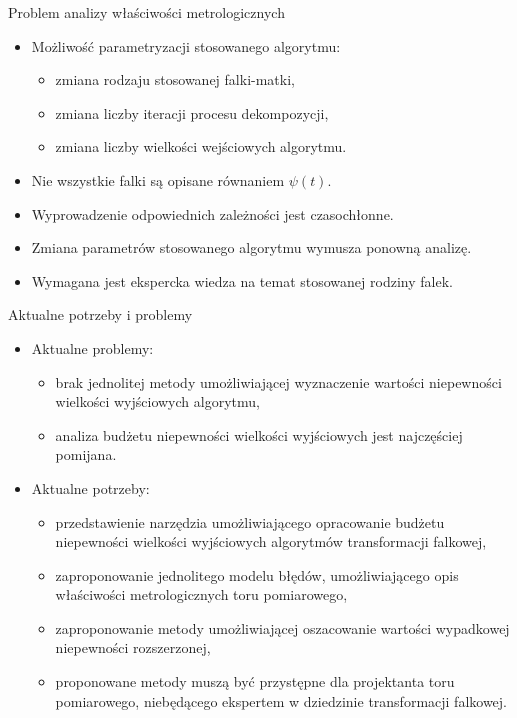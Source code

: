 \documentclass[12pt, polish, aspectratio = 169]{slides}
\begin{document}
\begin{frame}{Problem analizy właściwości metrologicznych}
\begin{itemize}
\item Możliwość parametryzacji stosowanego algorytmu:
	\begin{itemize}
	\item zmiana rodzaju stosowanej falki-matki,
	\item zmiana liczby iteracji procesu dekompozycji,
	\item zmiana liczby wielkości wejściowych algorytmu.
	\end{itemize}
\item Nie wszystkie falki są opisane równaniem $\psi(t)$.
\item Wyprowadzenie odpowiednich zależności jest czasochłonne.
\item Zmiana parametrów stosowanego algorytmu wymusza ponowną analizę.
\item Wymagana jest ekspercka wiedza na temat stosowanej rodziny falek.
\end{itemize}
\end{frame}

\begin{frame}{Aktualne potrzeby i problemy}
\begin{itemize}
\item Aktualne problemy:
	\begin{itemize}
	\item brak jednolitej metody umożliwiającej wyznaczenie wartości niepewności wielkości wyjściowych algorytmu,
	\item analiza budżetu niepewności wielkości wyjściowych jest najczęściej pomijana.
	\end{itemize}
\item Aktualne potrzeby:
	\begin{itemize}
	\item przedstawienie narzędzia umożliwiającego opracowanie budżetu niepewności wielkości wyjściowych algorytmów transformacji falkowej,
	\item zaproponowanie jednolitego modelu błędów, umożliwiającego opis właściwości metrologicznych toru pomiarowego,
	\item zaproponowanie metody umożliwiającej oszacowanie wartości wypadkowej niepewności rozszerzonej,
	\item proponowane metody muszą być przystępne dla projektanta toru pomiarowego, niebędącego ekspertem w dziedzinie transformacji falkowej.
	\end{itemize}
\end{itemize}
\end{frame}
\end{document}
